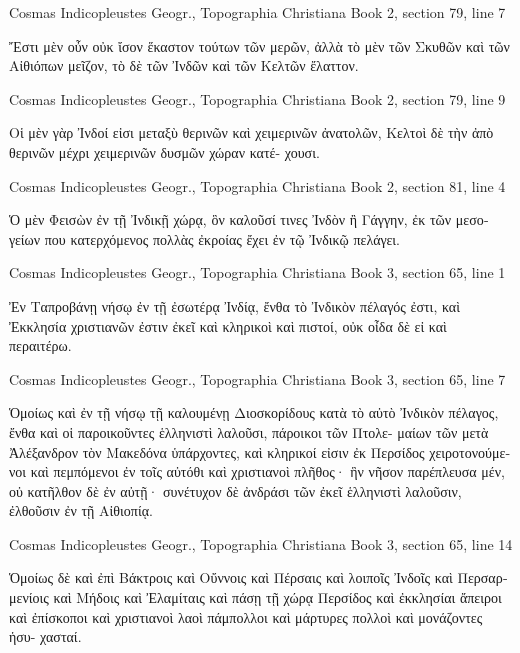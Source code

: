 \documentclass[12pt,letterpaper,twoside,final]{memoir}
\begin{document}
\begin{greek}
Cosmas Indicopleustes Geogr., Topographia Christiana 
Book 2, section 79, line 7

              Ἔστι μὲν οὖν οὐκ ἴσον ἕκαστον τούτων τῶν 
μερῶν, ἀλλὰ τὸ μὲν τῶν Σκυθῶν καὶ τῶν Αἰθιόπων μεῖζον, τὸ 
δὲ τῶν Ἰνδῶν καὶ τῶν Κελτῶν ἔλαττον. 



Cosmas Indicopleustes Geogr., Topographia Christiana 
Book 2, section 79, line 9

                                                       Οἱ μὲν γὰρ 
Ἰνδοί εἰσι μεταξὺ θερινῶν καὶ χειμερινῶν ἀνατολῶν, Κελτοὶ 
δὲ τὴν ἀπὸ θερινῶν μέχρι χειμερινῶν δυσμῶν χώραν κατέ-
χουσι. 



Cosmas Indicopleustes Geogr., Topographia Christiana 
Book 2, section 81, line 4

                                 Ὁ μὲν Φεισὼν ἐν τῇ Ἰνδικῇ χώρᾳ,   
ὃν καλοῦσί τινες Ἰνδὸν ἢ Γάγγην, ἐκ τῶν μεσογείων που 
κατερχόμενος πολλὰς ἐκροίας ἔχει ἐν τῷ Ἰνδικῷ πελάγει. 



Cosmas Indicopleustes Geogr., Topographia Christiana 
Book 3, section 65, line 1

Ἐν Ταπροβάνῃ νήσῳ ἐν τῇ ἐσωτέρᾳ Ἰνδίᾳ, ἔνθα τὸ 
Ἰνδικὸν πέλαγός ἐστι, καὶ Ἐκκλησία χριστιανῶν ἐστιν ἐκεῖ 
καὶ κληρικοὶ καὶ πιστοί, οὐκ οἶδα δὲ εἰ καὶ περαιτέρω. 



Cosmas Indicopleustes Geogr., Topographia Christiana 
Book 3, section 65, line 7

                                   Ὁμοίως καὶ ἐν τῇ νήσῳ τῇ 
καλουμένῃ Διοσκορίδους κατὰ τὸ αὐτὸ Ἰνδικὸν πέλαγος, ἔνθα 
καὶ οἱ παροικοῦντες ἑλληνιστὶ λαλοῦσι, πάροικοι τῶν Πτολε-
μαίων τῶν μετὰ Ἀλέξανδρον τὸν Μακεδόνα ὑπάρχοντες, καὶ   
κληρικοί εἰσιν ἐκ Περσίδος χειροτονούμενοι καὶ πεμπόμενοι 
ἐν τοῖς αὐτόθι καὶ χριστιανοὶ πλῆθος· ἣν νῆσον παρέπλευσα 
μέν, οὐ κατῆλθον δὲ ἐν αὐτῇ· συνέτυχον δὲ ἀνδράσι τῶν ἐκεῖ 
ἑλληνιστὶ λαλοῦσιν, ἐλθοῦσιν ἐν τῇ Αἰθιοπίᾳ. 



Cosmas Indicopleustes Geogr., Topographia Christiana 
Book 3, section 65, line 14

                                                         Ὁμοίως δὲ καὶ 
ἐπὶ Βάκτροις καὶ Οὔννοις καὶ Πέρσαις καὶ λοιποῖς Ἰνδοῖς καὶ 
Περσαρμενίοις καὶ Μήδοις καὶ Ἐλαμίταις καὶ πάσῃ τῇ χώρᾳ 
Περσίδος καὶ ἐκκλησίαι ἄπειροι καὶ ἐπίσκοποι καὶ χριστιανοὶ 
λαοὶ πάμπολλοι καὶ μάρτυρες πολλοὶ καὶ μονάζοντες ἡσυ-
χασταί. 




\end{greek}
\end{document}
